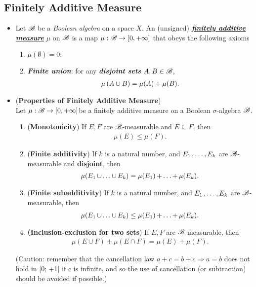\documentclass[11pt]{article}
\begin{document}
\subsection{Finitely Additive Measure}
\begin{itemize}
\item
\begin{definition}
Let ${\mathscr B}$ be a \emph{Boolean algebra} on a space $X$. An (unsigned) \underline{\emph{\textbf{finitely additive measure}}} $\mu$ on ${\mathscr B}$ is a map $\mu : {\mathscr B} \rightarrow [0,+\infty]$ that obeys the following axioms
\begin{enumerate}
\item $\mu(\emptyset) = 0$;
\item \emph{\textbf{Finite union}}: for any  \emph{\textbf{disjoint sets}} $A, B \in {\mathscr B}$, 
\begin{align*}
\mu\left(A\cup B\right) = \mu(A)+ \mu(B).
\end{align*} 
\end{enumerate}
\end{definition}

\item \begin{proposition} (\textbf{Properties of Finitely Additive Measure}) \citep{tao2011introduction}\\
Let $\mu: {\mathscr B} \rightarrow [0, +\infty]$be a finitely additive measure on a Boolean $\sigma$-algebra ${\mathscr B}$. 
\begin{enumerate}
\item (\textbf{Monotonicity}) If $E, F$ are ${\mathscr B}$-measurable and $E \subseteq F$, then
\begin{align*}
\mu(E) \le \mu(F).
\end{align*}
\item  (\textbf{Finite additivity}) If $k$ is a natural number, and $E_1 \,{,}\ldots{,}\, E_k$ are ${\mathscr B}$-measurable and \textbf{disjoint}, then 
\begin{align*}
\mu(E_1 \,{\cup}\ldots{\cup}\, E_k) = \mu(E_1)  \,{+}\ldots{+}\, \mu(E_k).
\end{align*}
\item  (\textbf{Finite subadditivity}) If $k$ is a natural number, and $E_1 \,{,}\ldots{,}\, E_k$ are ${\mathscr B}$-measurable, then
\begin{align*}
\mu(E_1 \,{\cup}\ldots{\cup}\, E_k) \le \mu(E_1)  \,{+}\ldots{+}\, \mu(E_k).
\end{align*}
\item \textbf{(Inclusion-exclusion for two sets}) If $E, F$ are ${\mathscr B}$-measurable, then
\begin{align*}
\mu(E \cup F ) + \mu(E \cap F ) = \mu(E) + \mu(F).
\end{align*}
\end{enumerate}
(Caution: remember that the cancellation law $a+c = b+c \Rightarrow a = b$ does not hold in [0; +1] if c is infinite, and so the use of cancellation
(or subtraction) should be avoided if possible.)
\end{proposition}


\end{itemize}
\end{document}
